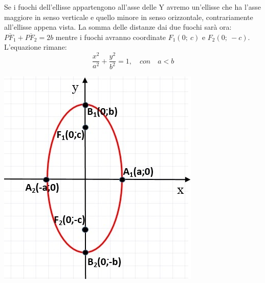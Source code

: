 \noindent \begin{minipage}{.75\textwidth}
   Se i fuochi dell'ellisse appartengono all'asse delle Y avremo 
un'ellisse che ha l'asse maggiore in senso verticale e quello minore in 
senso orizzontale, contrariamente all'ellisse appena vista. La somma delle 
distanze dai due fuochi sarà ora: $\overline{PF_{1}}+\overline{PF_{2}}=2b$ 
mentre i fuochi avranno coordinate $ F_{1} (0;~c)$ e $ F_{2} (0;~-c)$. 
L'equazione rimane:
  \begin{equation}
  \dfrac{x^{2}}{a^{2}}+\dfrac{y^{2}}{b^{2}}=1, \quad con  \quad a<b
  \end{equation}
  
\end{minipage}
 \hspace{0.5cm}
 \begin{minipage}{.2\textwidth}
   \includegraphics[width=\textwidth]{img/ellisseassey.jpg}
\end{minipage}

